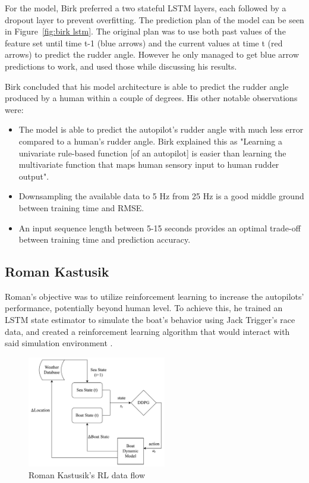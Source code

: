 \documentclass[12pt,twoside]{report}
\begin{document}
For the model, Birk preferred a two stateful LSTM layers, each followed by a dropout layer to prevent overfitting. The prediction plan of the model can be seen in Figure~\ref{fig:birk lstm}. The original plan was to use both past values of the feature set until time t-1 (blue arrows) and the current values at time t (red arrows) to predict the rudder angle. However he only managed to get blue arrow predictions to work, and used those while discussing his results.

Birk concluded that his model architecture is able to predict the rudder angle produced by a human within a couple of degrees. His other notable observations were: 
\begin{itemize}
  \item The model is able to predict the autopilot's rudder angle with much less error compared to a human's rudder angle. Birk explained this as "Learning a univariate rule-based function [of an autopilot] is easier than learning the multivariate function that maps human sensory input to human rudder output".
  \item Downsampling the available data to 5 Hz from 25 Hz is a good middle ground between training time and RMSE. 
  \item An input sequence length between 5-15 seconds provides an optimal trade-off between training time and prediction accuracy.
\end{itemize} 

\subsection{Roman Kastusik}
Roman's objective was to utilize reinforcement learning to increase the autopilots' performance, potentially beyond human level. To achieve this, he trained an LSTM state estimator to simulate the boat's behavior using Jack Trigger's race data, and created a reinforcement learning algorithm that would interact with said simulation environment \cite{roman}.

\begin{figure}
\centering
\includegraphics[width = 0.54\textwidth]{figures/roman data flow.png}
\caption{Roman Kastusik's RL data flow}
\label{fig:roman dataflow}
\end{figure}
\end{document}
